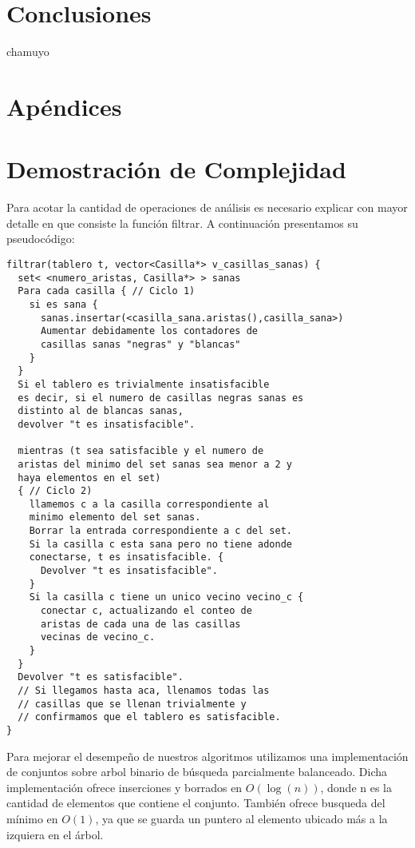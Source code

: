 \documentclass[a4paper, 12pt] {article}
\begin{document}
\section*{Conclusiones}
chamuyo


\section*{Ap\'endices} 
\section{Demostraci\'on de Complejidad}\label{demo:comp_3}

Para acotar la cantidad de operaciones de an\'alisis es necesario explicar con mayor detalle en que consiste la funci\'on filtrar.
A continuaci\'on presentamos su pseudoc\'odigo:

\begin{verbatim}
filtrar(tablero t, vector<Casilla*> v_casillas_sanas) {
  set< <numero_aristas, Casilla*> > sanas
  Para cada casilla { // Ciclo 1)
    si es sana {
      sanas.insertar(<casilla_sana.aristas(),casilla_sana>)
      Aumentar debidamente los contadores de 
      casillas sanas "negras" y "blancas"
    }
  }
  Si el tablero es trivialmente insatisfacible 
  es decir, si el numero de casillas negras sanas es 
  distinto al de blancas sanas,
  devolver "t es insatisfacible".
  
  mientras (t sea satisfacible y el numero de 
  aristas del minimo del set sanas sea menor a 2 y
  haya elementos en el set)
  { // Ciclo 2)
    llamemos c a la casilla correspondiente al
    minimo elemento del set sanas.
    Borrar la entrada correspondiente a c del set.
    Si la casilla c esta sana pero no tiene adonde 
    conectarse, t es insatisfacible. {
      Devolver "t es insatisfacible".
    }
    Si la casilla c tiene un unico vecino vecino_c {
      conectar c, actualizando el conteo de
      aristas de cada una de las casillas 
      vecinas de vecino_c.
    }
  }
  Devolver "t es satisfacible".
  // Si llegamos hasta aca, llenamos todas las
  // casillas que se llenan trivialmente y 
  // confirmamos que el tablero es satisfacible.
}

\end{verbatim}


Para mejorar el desempe\~no de nuestros algoritmos utilizamos una implementaci\'on de conjuntos sobre arbol binario de b\'usqueda parcialmente balanceado. Dicha implementaci\'on ofrece inserciones y borrados en $O\left( \log\left( n\right) \right) $, donde n es la cantidad de elementos que contiene el conjunto. Tambi\'en ofrece busqueda del m\'inimo en $O\left( 1\right) $, ya que se guarda un puntero al elemento ubicado m\'as a la izquiera en el \'arbol.
\end{document}
